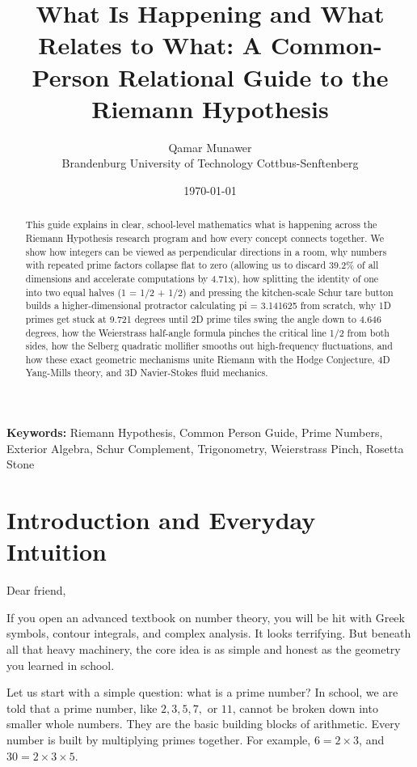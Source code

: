 \documentclass[11pt,a4paper]{article}
\title{\textbf{What Is Happening and What Relates to What: A Common-Person Relational Guide to the Riemann Hypothesis}}
\author{Qamar Munawer \\ Brandenburg University of Technology Cottbus-Senftenberg}
\date{\today}
\theoremstyle{definition}
\begin{document}
\maketitle

\begin{abstract}
This guide explains in clear, school-level mathematics what is happening across the Riemann Hypothesis research program and how every concept connects together. We show how integers can be viewed as perpendicular directions in a room, why numbers with repeated prime factors collapse flat to zero (allowing us to discard 39.2\% of all dimensions and accelerate computations by 4.71x), how splitting the identity of one into two equal halves (1 = 1/2 + 1/2) and pressing the kitchen-scale Schur tare button builds a higher-dimensional protractor calculating pi = 3.141625 from scratch, why 1D primes get stuck at 9.721 degrees until 2D prime tiles swing the angle down to 4.646 degrees, how the Weierstrass half-angle formula pinches the critical line 1/2 from both sides, how the Selberg quadratic mollifier smooths out high-frequency fluctuations, and how these exact geometric mechanisms unite Riemann with the Hodge Conjecture, 4D Yang-Mills theory, and 3D Navier-Stokes fluid mechanics.
\end{abstract}

\vspace{1em}
\noindent\textbf{Keywords:} Riemann Hypothesis, Common Person Guide, Prime Numbers, Exterior Algebra, Schur Complement, Trigonometry, Weierstrass Pinch, Rosetta Stone

\section{Introduction and Everyday Intuition}

Dear friend,

If you open an advanced textbook on number theory, you will be hit with Greek symbols, contour integrals, and complex analysis. It looks terrifying. But beneath all that heavy machinery, the core idea is as simple and honest as the geometry you learned in school.

Let us start with a simple question: what is a prime number? In school, we are told that a prime number, like $2, 3, 5, 7,$ or $11$, cannot be broken down into smaller whole numbers. They are the basic building blocks of arithmetic. Every number is built by multiplying primes together. For example, $6 = 2 \times 3$, and $30 = 2 \times 3 \times 5$.
\end{document}
